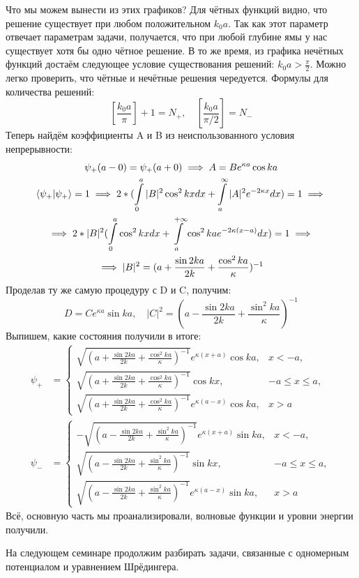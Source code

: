 Что мы можем вынести из этих графиков? Для чётных функций видно, что решение существует при любом положительном $k_0a$. Так как этот параметр отвечает параметрам задачи, получается, что при любой глубине ямы у нас существует хотя бы одно чётное решение. В то же время, из графика нечётных функций достаём следующее условие существования решений: $k_0a>\frac{\pi}{2}$. Можно легко проверить, что чётные и нечётные решения чередуется. Формулы для количества решений:
\[
\left[\frac{k_0a}{\pi}\right] + 1 = N_+, \quad \left[\frac{k_0a}{\pi/2}\right] = N_-
\]
Теперь найдём коэффициенты A и B из неиспользованного условия непрерывности:
\begin{gather*}
    \psi_+(a-0) = \psi_+(a+0) \implies A = Be^{\kappa a}\cos ka \\
    \braket{\psi_+} = 1 \implies 2 * (\int\limits_0^a |B|^2\cos^2 kx dx + \int\limits_a^\infty |A|^2e^{-2\kappa x} dx) = 1 \implies \\
    \implies 2 *|B|^2 (\int\limits_0^a \cos^2 kx dx + \int\limits_a^{+\infty }\cos^2 kae^{-2\kappa(x-a)} dx) = 1 \implies \\
    \implies |B|^2 = (a + \frac{\sin 2ka}{2k} + \frac{\cos^2 ka}{\kappa})^{-1} 
\end{gather*}
Проделав ту же самую процедуру с D и C, получим:
\[
D = Ce^{\kappa a}\sin ka, \quad |C|^2 = (a - \frac{\sin 2ka}{2k} + \frac{\sin^2 ka}{\kappa})^{-1}
\]
Выпишем, какие состояния получили в итоге:
\begin{align*}
\psi_+ &=
\begin{cases}
    \sqrt{(a + \frac{\sin 2ka}{2k} + \frac{\cos^2 ka}{\kappa})^{-1}}e^{\kappa (x + a)}\cos{ka}, & x < -a,\\
    \sqrt{(a + \frac{\sin 2ka}{2k} + \frac{\cos^2 ka}{\kappa})^{-1}} \cos kx, & -a \leq x \leq a,\\
    \sqrt{(a + \frac{\sin 2ka}{2k} + \frac{\cos^2 ka}{\kappa})^{-1}}e^{\kappa (a - x)}\cos{ka},& x > a
\end{cases}\\
\psi_- &=
\begin{cases}
    -\sqrt{(a - \frac{\sin 2ka}{2k} + \frac{\sin^2 ka}{\kappa})^{-1}}e^{\kappa (x+a)}\sin ka, & x < -a,\\
    \sqrt{(a - \frac{\sin 2ka}{2k} + \frac{\sin^2 ka}{\kappa})^{-1}} \sin kx, & -a \leq x \leq a,\\
    \sqrt{(a - \frac{\sin 2ka}{2k} + \frac{\sin^2 ka}{\kappa})^{-1}}e^{\kappa (a-x)}\sin ka, & x > a
\end{cases}
\end{align*}
Всё, основную часть мы проанализировали, волновые функции и уровни энергии получили.

На следующем семинаре продолжим разбирать задачи, связанные с одномерным потенциалом и уравнением Шрёдингера.

